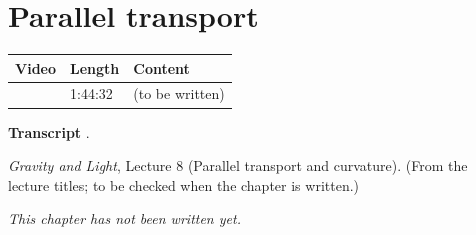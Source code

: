\chapter{Parallel transport}\label{ch:l23}
\begin{paracol}{2}

\begin{sources}
\begin{tabularx}{\linewidth}{@{}l l L@{}}
\toprule
\textbf{Video} & \textbf{Length} & \textbf{Content}\\
\midrule
{} & 1:44:32 & (to be written)\\
\bottomrule
\end{tabularx}

\smallskip
\textbf{Transcript} .
\end{sources}

\begin{reading}
\emph{Gravity and Light}, Lecture 8 (Parallel transport and curvature). (From the lecture titles; to be checked when the chapter is written.)
\end{reading}

\emph{This chapter has not been written yet.}

\flushside
\end{paracol}
